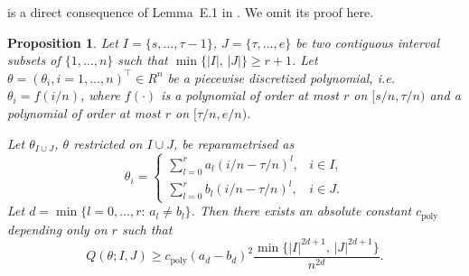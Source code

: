 \documentclass{article}
\newtheorem{proposition}[theorem]{Proposition}
\begin{document}
 is a direct consequence of Lemma~E.1 in \cite{shen2020phase}.  We omit its proof here.

\begin{proposition}\label{prop:1}
Let $I = \{s, \ldots, \tau - 1\}$, $J = \{\tau, \ldots, e\}$ be two contiguous interval subsets of $\{1, \ldots, n\}$ such that $\min\{|I|, \, |J|\} \geq r + 1$.  Let $\theta = (\theta_i, i = 1, \ldots, n)^{\top} \in {R}^n$ be a piecewise discretized polynomial, i.e.~$\theta_i = f(i/n)$, where $f(\cdot)$ is a polynomial of order at most $r$ on $[s/n, \tau/n)$ and a polynomial of order at most $r$ on $[\tau/n, e/n)$.  

Let $\theta_{I \cup J}$, $\theta$ restricted on $I \cup J$, be reparametrised as 
	\[
		\theta_i = \begin{cases}
 			\sum_{l = 0}^r a_l (i/n - \tau/n)^l, & i \in I, \\
 			\sum_{l = 0}^r b_l (i/n - \tau/n)^l, & i \in J.
 		\end{cases}
	\]
	Let $d = \min\{l = 0, \ldots, r: \, a_l \neq b_l\}$.  Then there exists an absolute constant $c_{\mathrm{poly}}$ depending only on $r$ such that
	\[
		Q(\theta; I, J) \geq c_{\mathrm{poly}} (a_d - b_d)^2 \frac{\min\{|I|^{2d + 1}, \, |J|^{2d + 1}\}}{n^{2d}}.
	\]
\end{proposition}
\end{document}
